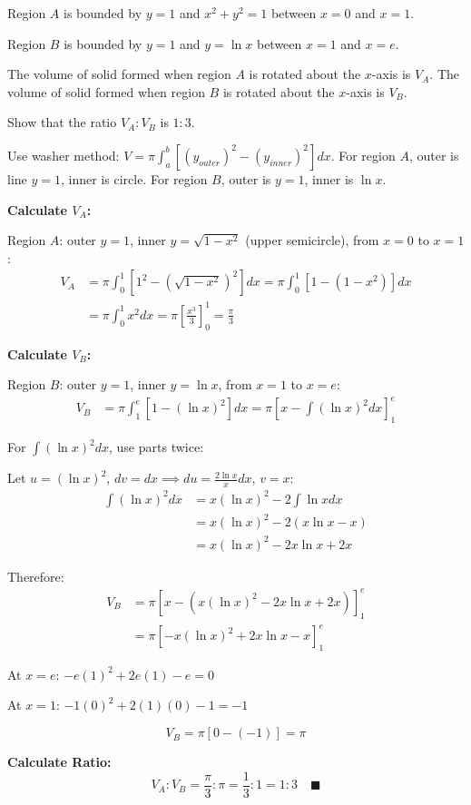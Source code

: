 \begin{problem}
Region $A$ is bounded by $y=1$ and $x^2 + y^2 = 1$ between $x=0$ and $x=1$.

Region $B$ is bounded by $y=1$ and $y = \ln x$ between $x=1$ and $x=e$.

The volume of solid formed when region $A$ is rotated about the $x$-axis is $V_A$.
The volume of solid formed when region $B$ is rotated about the $x$-axis is $V_B$.

Show that the ratio $V_A : V_B$ is $1:3$.
\end{problem}

\begin{hint}
Use washer method: $V = \pi \int_a^b [(y_{outer})^2 - (y_{inner})^2] dx$. For region $A$, outer is line $y=1$, inner is circle. For region $B$, outer is $y=1$, inner is $\ln x$.
\end{hint}

\begin{solution}
\textbf{Calculate $V_A$:}

Region $A$: outer $y=1$, inner $y=\sqrt{1-x^2}$ (upper semicircle), from $x=0$ to $x=1$:
\begin{align*}
V_A &= \pi \int_0^1 [1^2 - (\sqrt{1-x^2})^2] dx = \pi \int_0^1 [1 - (1-x^2)] dx \\
&= \pi \int_0^1 x^2 dx = \pi \left[ \frac{x^3}{3} \right]_0^1 = \frac{\pi}{3}
\end{align*}

\textbf{Calculate $V_B$:}

Region $B$: outer $y=1$, inner $y=\ln x$, from $x=1$ to $x=e$:
\begin{align*}
V_B &= \pi \int_1^e [1 - (\ln x)^2] dx = \pi \left[ x - \int (\ln x)^2 dx \right]_1^e
\end{align*}

For $\int (\ln x)^2 dx$, use parts twice:

Let $u = (\ln x)^2$, $dv = dx \implies du = \frac{2\ln x}{x}dx$, $v = x$:
\begin{align*}
\int (\ln x)^2 dx &= x(\ln x)^2 - 2\int \ln x dx \\
&= x(\ln x)^2 - 2(x\ln x - x) \\
&= x(\ln x)^2 - 2x\ln x + 2x
\end{align*}

Therefore:
\begin{align*}
V_B &= \pi [x - (x(\ln x)^2 - 2x\ln x + 2x)]_1^e \\
&= \pi [-x(\ln x)^2 + 2x\ln x - x]_1^e
\end{align*}

At $x=e$: $-e(1)^2 + 2e(1) - e = 0$

At $x=1$: $-1(0)^2 + 2(1)(0) - 1 = -1$

\[
V_B = \pi[0 - (-1)] = \pi
\]

\textbf{Calculate Ratio:}
\[
V_A : V_B = \frac{\pi}{3} : \pi = \frac{1}{3} : 1 = \boxed{1 : 3} \quad \blacksquare
\]
\end{solution}

